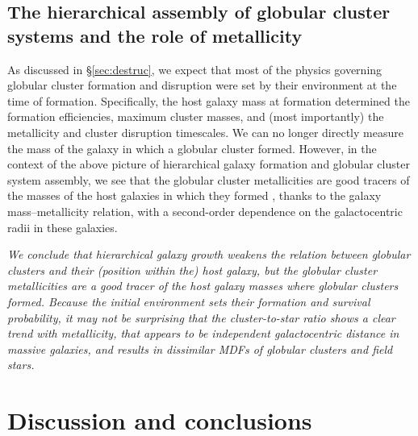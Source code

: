 \documentclass{aa}
\begin{document}
\subsection{The hierarchical assembly of globular cluster systems and the role of metallicity} \label{sec:cosmology:hierarchy}

As discussed in \S\ref{sec:destruc}, we expect that most of the physics governing globular cluster formation and disruption were set by their environment at the time of formation. Specifically, the host galaxy mass at formation determined the formation efficiencies, maximum cluster masses, and (most importantly) the metallicity and cluster disruption timescales. We can no longer directly measure the mass of the galaxy in which a globular cluster formed. However, in the context of the above picture of hierarchical galaxy formation and globular cluster system assembly, we see that the globular cluster metallicities are good tracers of the masses of the host galaxies in which they formed \citep[e.g.][]{kruijssen15b}, thanks to the galaxy mass--metallicity relation, with a second-order dependence on the galactocentric radii in these galaxies. 

{\it We conclude that hierarchical galaxy growth weakens the relation between globular clusters and their (position within the) host galaxy, but the globular cluster metallicities are a good tracer of the host galaxy masses where globular clusters formed. Because the initial environment sets their formation and survival probability, it may not be surprising that the cluster-to-star ratio shows a clear trend with metallicity, that appears to be independent galactocentric distance in massive galaxies, and results in dissimilar MDFs of globular clusters and field stars.} 




\section{Discussion  and conclusions}  
\label{sec:conclusions}
\end{document}
